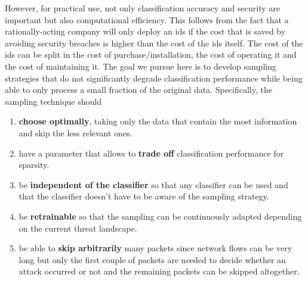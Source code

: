 \documentclass[conference]{IEEEtran}
\begin{document}
However, for practical use, not only classification accuracy and security are important but also computational efficiency. This follows from the fact that a rationally-acting company will only deploy an \gls{ids} if the cost that is saved by avoiding security breaches is higher than the cost of the \gls{ids} itself. The cost of the \gls{ids} can be split in the cost of purchase/installation, the cost of operating it and the cost of maintaining it. The goal we pursue here is to develop sampling strategies that do not significantly degrade classification performance while being able to only process a small fraction of the original data. Specifically, the sampling technique should


\begin{enumerate}
\item \textbf{choose optimally}, taking only the data that contain the most information and skip the less relevant ones. 
\item have a parameter that allows to \textbf{trade off} classification performance for sparsity.
\item be \textbf{independent of the classifier} so that any classifier can be used and that the classifier doesn't have to be aware of the sampling strategy. 
\item be \textbf{retrainable} so that the sampling can be continuously adapted depending on the current threat landscape. 
\item be able to \textbf{skip arbitrarily} many packets since network flows can be very long but only the first couple of packets are needed to decide whether an attack occurred or not and the remaining packets can be skipped altogether. 
\end{enumerate}
\end{document}
